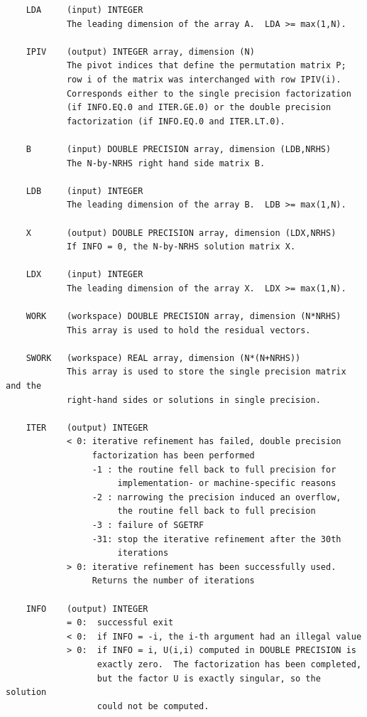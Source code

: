 \documentclass[10pt]{book}
\begin{document}
\begin{verbatim}
    LDA     (input) INTEGER
            The leading dimension of the array A.  LDA >= max(1,N).

    IPIV    (output) INTEGER array, dimension (N)
            The pivot indices that define the permutation matrix P;
            row i of the matrix was interchanged with row IPIV(i).
            Corresponds either to the single precision factorization
            (if INFO.EQ.0 and ITER.GE.0) or the double precision
            factorization (if INFO.EQ.0 and ITER.LT.0).

    B       (input) DOUBLE PRECISION array, dimension (LDB,NRHS)
            The N-by-NRHS right hand side matrix B.

    LDB     (input) INTEGER
            The leading dimension of the array B.  LDB >= max(1,N).

    X       (output) DOUBLE PRECISION array, dimension (LDX,NRHS)
            If INFO = 0, the N-by-NRHS solution matrix X.

    LDX     (input) INTEGER
            The leading dimension of the array X.  LDX >= max(1,N).

    WORK    (workspace) DOUBLE PRECISION array, dimension (N*NRHS)
            This array is used to hold the residual vectors.

    SWORK   (workspace) REAL array, dimension (N*(N+NRHS))
            This array is used to store the single precision matrix and the
            right-hand sides or solutions in single precision.

    ITER    (output) INTEGER
            < 0: iterative refinement has failed, double precision
                 factorization has been performed
                 -1 : the routine fell back to full precision for
                      implementation- or machine-specific reasons
                 -2 : narrowing the precision induced an overflow,
                      the routine fell back to full precision
                 -3 : failure of SGETRF
                 -31: stop the iterative refinement after the 30th
                      iterations
            > 0: iterative refinement has been successfully used.
                 Returns the number of iterations
 
    INFO    (output) INTEGER
            = 0:  successful exit
            < 0:  if INFO = -i, the i-th argument had an illegal value
            > 0:  if INFO = i, U(i,i) computed in DOUBLE PRECISION is
                  exactly zero.  The factorization has been completed,
                  but the factor U is exactly singular, so the solution
                  could not be computed.


\end{verbatim}
\end{document}

